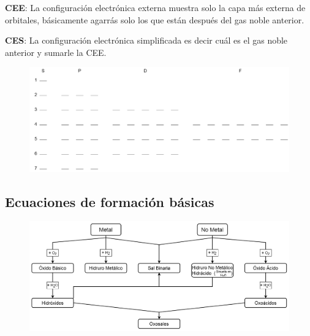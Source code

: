 \textbf{CEE}: La configuración electrónica externa muestra solo la capa más externa de orbitales, básicamente agarrás solo los que están después del gas noble anterior.

\textbf{CES}: La configuración electrónica simplificada es decir cuál es el gas noble anterior y sumarle la CEE.

\begin{figure}[H]
    \centering
    \includegraphics[width=0.8\linewidth]{Images/Orbitales.png}
\end{figure}

\subsection*{Ecuaciones de formación básicas}

\begin{figure}[H]
    \centering
    \includegraphics[width=0.9\linewidth]{Images/ecuaciones_formacion.png}
\end{figure}
